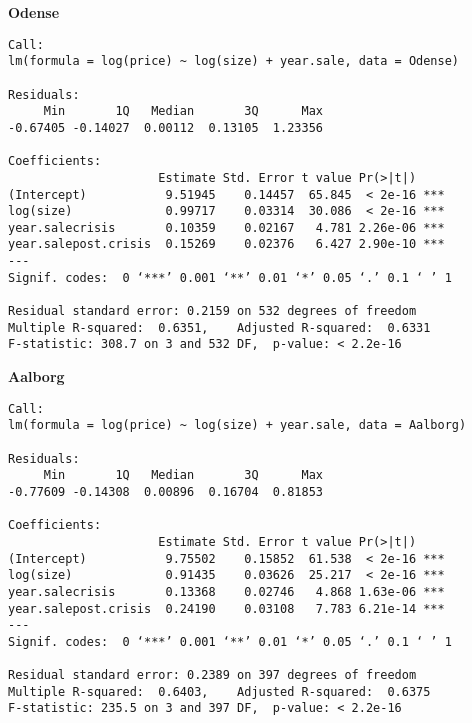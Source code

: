 \textbf{Odense}
\begin{lstlisting}
Call:
lm(formula = log(price) ~ log(size) + year.sale, data = Odense)

Residuals:
     Min       1Q   Median       3Q      Max 
-0.67405 -0.14027  0.00112  0.13105  1.23356 

Coefficients:
                     Estimate Std. Error t value Pr(>|t|)    
(Intercept)           9.51945    0.14457  65.845  < 2e-16 ***
log(size)             0.99717    0.03314  30.086  < 2e-16 ***
year.salecrisis       0.10359    0.02167   4.781 2.26e-06 ***
year.salepost.crisis  0.15269    0.02376   6.427 2.90e-10 ***
---
Signif. codes:  0 ‘***’ 0.001 ‘**’ 0.01 ‘*’ 0.05 ‘.’ 0.1 ‘ ’ 1

Residual standard error: 0.2159 on 532 degrees of freedom
Multiple R-squared:  0.6351,	Adjusted R-squared:  0.6331 
F-statistic: 308.7 on 3 and 532 DF,  p-value: < 2.2e-16
\end{lstlisting}

\textbf{Aalborg}
\begin{lstlisting}
Call:
lm(formula = log(price) ~ log(size) + year.sale, data = Aalborg)

Residuals:
     Min       1Q   Median       3Q      Max 
-0.77609 -0.14308  0.00896  0.16704  0.81853 

Coefficients:
                     Estimate Std. Error t value Pr(>|t|)    
(Intercept)           9.75502    0.15852  61.538  < 2e-16 ***
log(size)             0.91435    0.03626  25.217  < 2e-16 ***
year.salecrisis       0.13368    0.02746   4.868 1.63e-06 ***
year.salepost.crisis  0.24190    0.03108   7.783 6.21e-14 ***
---
Signif. codes:  0 ‘***’ 0.001 ‘**’ 0.01 ‘*’ 0.05 ‘.’ 0.1 ‘ ’ 1

Residual standard error: 0.2389 on 397 degrees of freedom
Multiple R-squared:  0.6403,	Adjusted R-squared:  0.6375 
F-statistic: 235.5 on 3 and 397 DF,  p-value: < 2.2e-16
\end{lstlisting}